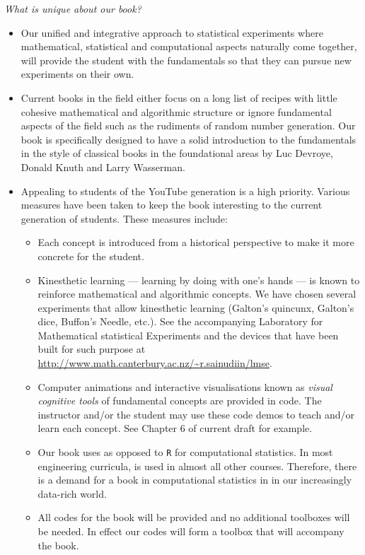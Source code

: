 \documentclass[a4paper]{letter}
\begin{document}
\begin{letter}{}
{\em What is unique about our book?}

\begin{itemize}
\item Our unified and integrative approach to statistical experiments where mathematical, statistical and computational aspects naturally come together, will provide the student with the fundamentals so that they can pursue new experiments on their own.
\item Current books in the field either focus on a long list of recipes with little cohesive mathematical and algorithmic structure or ignore fundamental aspects of the field such as the rudiments of random number generation.  Our book is specifically designed to have a solid introduction to the fundamentals in the style of classical books in the foundational areas by Luc Devroye, Donald Knuth and Larry Wasserman.
\item Appealing to students of the YouTube generation is a high priority.  Various measures have been taken to keep the book interesting to the current generation of students.  These measures include:
\begin{itemize}
\item Each concept is introduced from a historical perspective to make it more concrete for the student.
\item Kinesthetic learning --- learning by doing with one's hands --- is known to reinforce mathematical and algorithmic concepts.  We have chosen several experiments that allow kinesthetic learning (Galton's quincunx, Galton's dice, Buffon's Needle, etc.).  See the accompanying Laboratory for Mathematical statistical Experiments and the devices that have been built for such purpose at \url{http://www.math.canterbury.ac.nz/~r.sainudiin/lmse}.
\item Computer animations and interactive visualisations known as {\em visual cognitive tools} of fundamental concepts are provided in \Matlab code.  The instructor and/or the student may use these code demos to teach and/or learn each concept.  See Chapter 6 of current draft for example.
\item Our book uses \Matlab as opposed to {\tt R} for computational statistics.  In most engineering curricula, \Matlab is used in almost all other courses.  Therefore, there is a demand for a book in computational statistics in \Matlab in our increasingly data-rich world.
\item All codes for the book will be provided and no additional toolboxes will be needed.  In effect our codes will form a toolbox that will accompany the book.

\end{itemize}
\end{itemize}
\end{letter}
\end{document}
